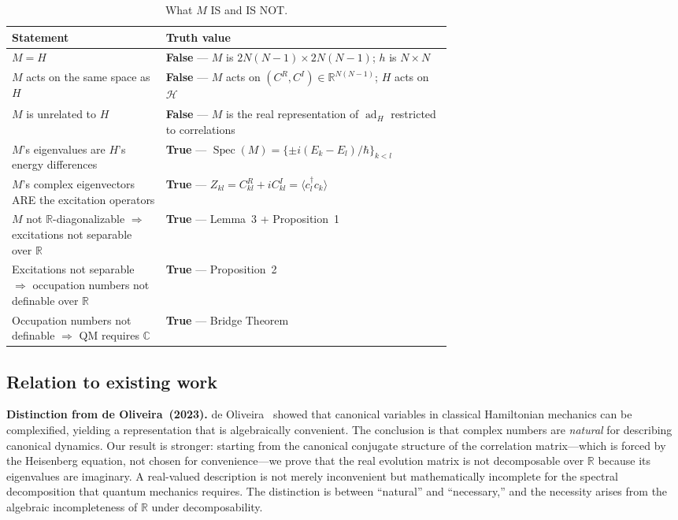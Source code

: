 \documentclass[aps,pra,preprint,groupedaddress,amsmath,amssymb,floatfix]{revtex4-2}
\begin{document}
\begin{table}[t]
\caption{What $M$ IS and IS NOT.}
\label{tab:M_identity}
\begin{ruledtabular}
\begin{tabular}{lp{0.65\linewidth}}
Statement & Truth value \\
\hline
$M = H$ & \textbf{False} --- $M$ is $2N(N-1)\times 2N(N-1)$; $h$ is $N\times N$ \\
$M$ acts on the same space as $H$ & \textbf{False} --- $M$ acts on $(C^R,C^I)\in\mathbb{R}^{N(N-1)}$; $H$ acts on $\mathcal{H}$ \\
$M$ is unrelated to $H$ & \textbf{False} --- $M$ is the real representation of $\operatorname{ad}_H$ restricted to correlations \\
$M$'s eigenvalues are $H$'s energy differences & \textbf{True} --- $\operatorname{Spec}(M) = \{\pm i(E_k-E_l)/\hbar\}_{k<l}$ \\
$M$'s complex eigenvectors ARE the excitation operators & \textbf{True} --- $Z_{kl} = C^R_{kl}+iC^I_{kl} = \langle c^\dagger_l c_k\rangle$ \\
$M$ not $\mathbb{R}$-diagonalizable $\Rightarrow$ excitations not separable over $\mathbb{R}$ & \textbf{True} --- Lemma~3 + Proposition~1 \\
Excitations not separable $\Rightarrow$ occupation numbers not definable over $\mathbb{R}$ & \textbf{True} --- Proposition~2 \\
Occupation numbers not definable $\Rightarrow$ QM requires $\mathbb{C}$ & \textbf{True} --- Bridge Theorem \\
\end{tabular}
\end{ruledtabular}
\end{table}

\subsection{Relation to existing work}
\label{sec:th1_relation}

\textbf{Distinction from de Oliveira~(2023).} de Oliveira~\cite{deoliveira2023} showed that canonical variables in classical Hamiltonian mechanics can be complexified, yielding a representation that is algebraically convenient. The conclusion is that complex numbers are \textit{natural} for describing canonical dynamics. Our result is stronger: starting from the canonical conjugate structure of the correlation matrix---which is forced by the Heisenberg equation, not chosen for convenience---we prove that the real evolution matrix is not decomposable over $\mathbb{R}$ because its eigenvalues are imaginary. A real-valued description is not merely inconvenient but mathematically incomplete for the spectral decomposition that quantum mechanics requires. The distinction is between ``natural'' and ``necessary,'' and the necessity arises from the algebraic incompleteness of $\mathbb{R}$ under decomposability.
\end{document}
